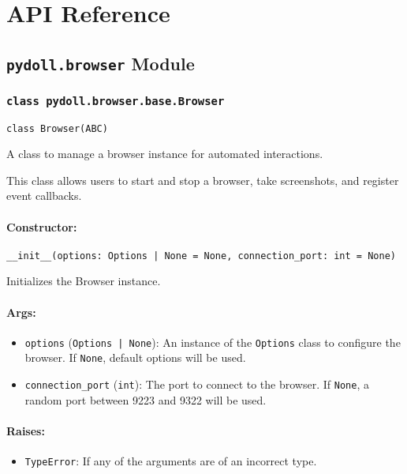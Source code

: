\documentclass{article}
\begin{document}
\section{API Reference}
\hrulefill

\subsection*{\texttt{pydoll.browser} Module}

\subsubsection*{\texttt{class pydoll.browser.base.Browser}}
\noindent\texttt{class Browser(ABC)}

\noindent A class to manage a browser instance for automated interactions.

\noindent This class allows users to start and stop a browser, take screenshots, and register event callbacks.

\paragraph{Constructor:}
\noindent\texttt{\_\_init\_\_(options: Options | None = None, connection\_port: int = None)}

\noindent Initializes the Browser instance.

\paragraph{Args:}
\begin{itemize}
    \item \texttt{options} (\texttt{Options | None}): An instance of the \texttt{Options} class to configure the browser. If \texttt{None}, default options will be used.
    \item \texttt{connection\_port} (\texttt{int}): The port to connect to the browser. If \texttt{None}, a random port between 9223 and 9322 will be used.
\end{itemize}

\paragraph{Raises:}
\begin{itemize}
    \item \texttt{TypeError}: If any of the arguments are of an incorrect type.
\end{itemize}
\end{document}
